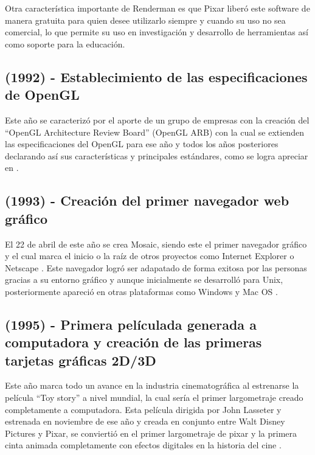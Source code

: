 \documentclass[12pt,letter paper]{article}
\begin{document}
Otra característica importante de Renderman es que Pixar liberó este software de manera gratuita para quien desee utilizarlo siempre y cuando su uso no sea comercial, lo que permite su uso en investigación y desarrollo de herramientas así como soporte para la educación.\vspace{\baselineskip} 

\subsection{(1992) - Establecimiento de las especificaciones de OpenGL }

Este año se caracterizó por el aporte de un grupo de empresas con la creación del ``OpenGL Architecture Review Board'' (OpenGL ARB) con la cual se extienden las especificaciones del OpenGL para ese año y todos los años posteriores declarando así sus características y principales estándares, como se logra apreciar en \cite{OpenGL} .\vspace{\baselineskip}

\subsection{(1993) - Creación del primer navegador web gráfico}

El 22 de abril de este año se crea Mosaic, siendo este el primer navegador gráfico y el cual marca el inicio o la raíz de otros proyectos como Internet Explorer o Netscape \cite{Mosaic}. Este navegador logró ser adapatado de forma exitosa por las personas gracias a su entorno gráfico y aunque inicialmente se desarrolló para Unix, posteriormente apareció en otras plataformas como Windows y Mac OS .\vspace{\baselineskip}

\subsection{(1995) - Primera películada generada a computadora y creación de las primeras tarjetas gráficas 2D/3D}

Este año marca todo un avance en la industria cinematográfica al estrenarse la película ``Toy story'' a nivel mundial, la cual sería el primer largometraje creado completamente a computadora. Esta película dirigida por John Lasseter y estrenada en noviembre de ese año y creada en conjunto entre Walt Disney Pictures y Pixar, se conviertió en el primer largometraje de pixar y la primera cinta animada completamente con efectos digitales en la historia del cine \cite{ToyStory} .\vspace{\baselineskip}
\end{document}
